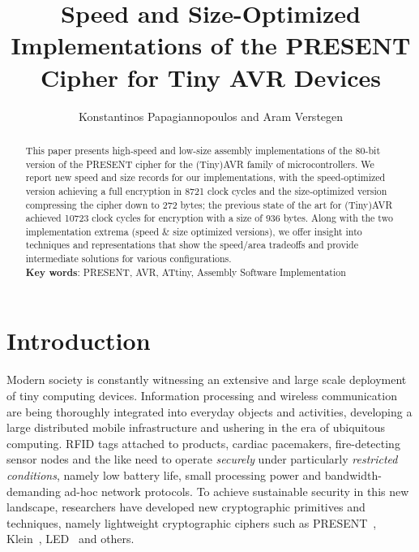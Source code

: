 \documentclass[11pt]{llncs2e} %
\begin{document}
\title{Speed and Size-Optimized Implementations of the PRESENT Cipher for Tiny AVR Devices}

\author{Konstantinos Papagiannopoulos and Aram Verstegen}
\maketitle

\begin{abstract}
This paper presents high-speed and low-size assembly implementations of the 80-bit version of the PRESENT cipher for the (Tiny)AVR family of microcontrollers. We report new speed and size records for our implementations, with the speed-optimized version achieving a full encryption in 8721 clock cycles and the size-optimized version compressing the cipher down to 272 bytes; the previous state of the art for (Tiny)AVR achieved 10723 clock cycles for encryption with a size of 936 bytes. Along with the two implementation extrema (speed \& size optimized versions), we offer insight into techniques and representations that show the speed/area tradeoffs and provide intermediate solutions for various configurations.\\
\textbf{Key words}: PRESENT, AVR, ATtiny, Assembly Software Implementation
\end{abstract}
\section{Introduction}
Modern society is constantly witnessing an extensive and large scale deployment of tiny computing devices. Information processing and wireless communication are being thoroughly integrated into everyday objects and activities, developing a large distributed mobile infrastructure and ushering in the era of ubiquitous computing. RFID tags attached to products, cardiac pacemakers, fire-detecting sensor nodes and the like need to operate \emph{securely} under particularly \emph{restricted conditions}, namely low battery life, small processing power and bandwidth-demanding ad-hoc network protocols. To achieve sustainable security in this new landscape, researchers have developed new cryptographic primitives and techniques, namely lightweight cryptographic ciphers such as PRESENT~\cite{bogdanov2007present}, Klein~\cite{gong2012klein}, LED~\cite{guo2011led} and others.
\end{document}

